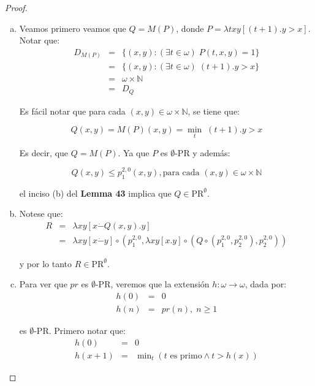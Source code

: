   \begin{proof}
    \begin{enumerate}[a)]
      \item Veamos primero veamos que $Q=M(P)$, donde $P=\lambda txy\left[(t+1).y > x\right]$. Notar que:
        \begin{eqnarray*}
          D_{M(P)} &=& \{(x,y): (\exists t \in \omega) \; P(t,x,y) = 1\} \\
          &=& \{(x,y): (\exists t \in \omega) \; (t+1).y > x \} \\
          &=& \omega \times \mathbb{N} \\
          &=& D_{Q}
        \end{eqnarray*}

        \PN Es fácil notar que para cada $(x,y) \in \omega \times \mathbb{N}$, se tiene que:

        \[
          Q(x,y) = M(P)(x,y) = \min_{t} \; (t+1).y > x
        \]

        \PN Es decir, que $Q=M(P)$. Ya que $P$ es $\emptyset$-PR y además:

        \[
          Q(x,y) \leq p_{1}^{2,0}(x,y), \text{para cada }(x,y) \in \omega \times \mathbb{N}
        \]

        \PN el inciso (b) del \textbf{Lemma 43} implica que $Q \in \mathrm{PR}^{\emptyset}$.
      \item Notese que:
        \begin{eqnarray*}
          R &=& \lambda xy\left[x \dot{-}Q(x,y).y\right] \\
          &=& \lambda xy \left[x \dot{-}y\right] \circ (p_{1}^{2,0}, \lambda xy \left[x.y\right] \circ (Q
            \circ (p_{1}^{2,0}, p_{2}^{2,0}), p_{2}^{2,0}))
        \end{eqnarray*}

        \PN y por lo tanto $R \in \mathrm{PR}^{\emptyset}$.
      \item Para ver que $pr$ es $\emptyset$-PR, veremos que la extensión $h: \omega \rightarrow \omega$, dada por:
        \begin{eqnarray*}
          h(0) &=& 0 \\
          h(n) &=& pr(n), \; n \geq 1
        \end{eqnarray*}

        \PN es $\emptyset$-PR. Primero notar que:
        \begin{eqnarray*}
          h(0) &=& 0 \\
          h(x+1) &=& \min\nolimits_{t}\left(t \text{ es primo} \wedge t > h(x)\right)
        \end{eqnarray*}


\end{enumerate}
\end{proof}

